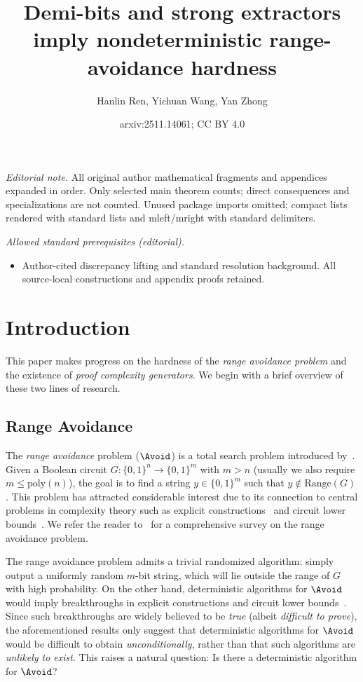 \documentclass[10pt,a4paper]{article}
\title{Demi-bits and strong extractors imply nondeterministic range-avoidance hardness}
\author{Hanlin Ren, Yichuan Wang, Yan Zhong}
\date{arxiv:2511.14061; CC BY 4.0}
\theoremstyle{definition}
\theoremstyle{remark}
\renewcommand{\poly}{\mathrm{poly}}
\newcommand{\Range}{\mathrm{Range}}
\begin{document}
\maketitle
\noindent\textit{Editorial note.} All original author mathematical fragments and appendices expanded in order. Only selected main theorem counts; direct consequences and specializations are not counted. Unused package imports omitted; compact lists rendered with standard lists and mleft/mright with standard delimiters.\par\medskip
\noindent\textit{Allowed standard prerequisites (editorial).}\begin{itemize}
\item Author-cited discrepancy lifting and standard resolution background. All source-local constructions and appendix proofs retained.
\end{itemize}\medskip
\section{Introduction}







This paper makes progress on the hardness of the \emph{range avoidance problem} and the existence of \emph{proof complexity generators}. We begin with a brief overview of these two lines of research.




\subsection{Range Avoidance}
The \emph{range avoidance} problem ($\Avoid$) is a total search problem introduced by~\cite{KKMP21,Korten21,RenSW22}. Given a Boolean circuit $G: \{0,1\}^n \rightarrow \{0,1\}^m$ with $m > n$ (usually we also require $m\leq\poly(n)$), the goal is to find a string $y \in \{0,1\}^m$ such that $y \not\in \Range(G)$. This problem has attracted considerable interest due to its connection to central problems in complexity theory such as explicit constructions~\cite{Korten21, RenSW22, ChenHLR23, GuruswamiLW22, GajulapalliGNS23} and circuit lower bounds~\cite{Korten21, CHR24, Li24, KortenP24}. We refer the reader to~\cite{Korten-EATCS} for a comprehensive survey on the range avoidance problem. %

The range avoidance problem admits a trivial randomized algorithm: simply output a uniformly random $m$-bit string, which will lie outside the range of $G$ with high probability. On the other hand, deterministic algorithms for $\Avoid$ would imply breakthroughs in explicit constructions and circuit lower bounds~\cite{Korten21, RenSW22, GuruswamiLW22, GajulapalliGNS23}. Since such breakthroughs are widely believed to be \emph{true} (albeit \emph{difficult to prove}), the aforementioned results only suggest that deterministic algorithms for $\Avoid$ would be difficult to obtain \emph{unconditionally}, rather than that such algorithms are \emph{unlikely to exist}. This raises a natural question: Is there a deterministic algorithm for $\Avoid$?
\end{document}
